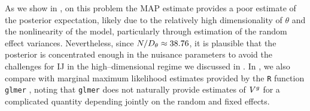 As we show in , on this problem the MAP
estimate provides a poor estimate of the posterior expectation, likely due to
the relatively high dimensionality of $\theta$ and the nonlinearity of the
model, particularly through estimation of the random effect variances.
Nevertheless, since $N / D_\theta \approx 38.76$, it is plausible that the
posterior is concentrated enough in the nuisance parameters to avoid the
challenges for IJ in the high--dimensional regime we discussed in
. In , we also compare
with marginal maximum likelihood estimates provided by the \texttt{R} function
\texttt{glmer} \citep{bates:2015:lme4}, noting that \texttt{glmer} does not
naturally provide estimates of $V^g$ for a complicated quantity depending
jointly on the random and fixed effects.



